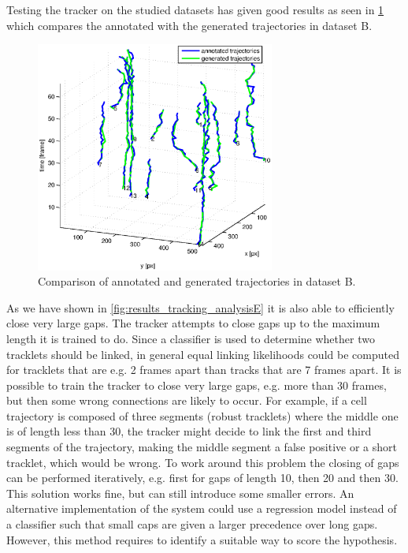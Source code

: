 	Testing the tracker on the studied datasets has given good results as seen in \cref{fig:tracking_results_datasetBlongerthan10} which compares the annotated with the generated trajectories in dataset B.
	
	\begin{figure}[h]
		\centering
		\includegraphics[width=0.7\textwidth]{images/fig_results_tracking_analysis_2}
		\caption{Comparison of annotated and generated trajectories in dataset B.}
		\label{fig:tracking_results_datasetBlongerthan10}
	\end{figure}
	
	As we have shown in \cref{fig:results_tracking_analysisE} it is also able to efficiently close very large gaps. The tracker attempts to close gaps up to the maximum length it is trained to do. Since a classifier is used to determine whether two tracklets should be linked, in general equal linking likelihoods could be computed for tracklets that are e.g. 2 frames apart than tracks that are 7 frames apart. It is possible to train the tracker to close very large gaps, e.g. more than 30 frames, but then some wrong connections are likely to occur. For example, if a cell trajectory is composed of three segments (robust tracklets) where the middle one is of length less than 30, the tracker might decide to link the first and third segments of the trajectory, making the middle segment a false positive or a short tracklet, which would be wrong. To work around this problem the closing of gaps can be performed iteratively, e.g. first for gaps of length 10, then 20 and then 30. This solution works fine, but can still introduce some smaller errors. An alternative implementation of the system could use a regression model instead of a classifier such that small caps are given a larger precedence over long gaps. However, this method requires to identify a suitable way to score the hypothesis.
	
